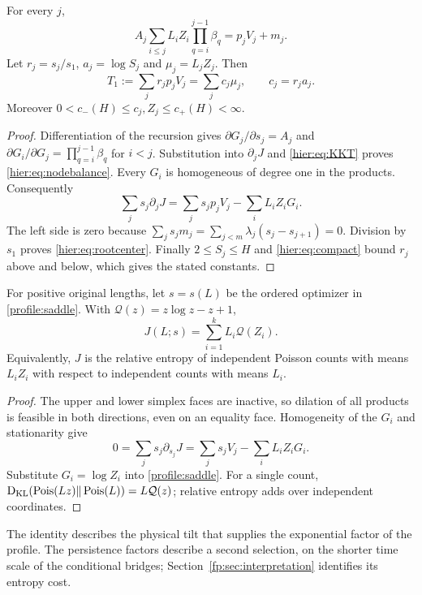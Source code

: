 \begin{lemma}\label{hier:lem:KKT}
For every $j$,
\begin{equation}
 A_j\sum_{i\le j}L_iZ_i\prod_{q=i}^{j-1}\beta_q=p_jV_j+m_j.
 \label{hier:eq:nodebalance}
\end{equation}
Let $r_j=s_j/s_1$, $a_j=\log S_j$ and
$\mu_j=L_jZ_j$. Then
\begin{equation}
 T_1:=\sum_jr_jp_jV_j=\sum_j c_j\mu_j,
 \qquad c_j=r_ja_j. \label{hier:eq:rootcenter}
\end{equation}
Moreover $0<c_-(H)\le c_j,Z_j\le c_+(H)<\infty$.
\end{lemma}
\begin{proof}
Differentiation of the recursion gives
$\partial G_j/\partial s_j=A_j$ and
$\partial G_i/\partial G_j=\prod_{q=i}^{j-1}\beta_q$ for $i<j$.
Substitution into $\partial_jJ$ and \eqref{hier:eq:KKT} proves
\eqref{hier:eq:nodebalance}.
Every $G_i$ is homogeneous of degree one in the products.
Consequently
\[
 \sum_js_j\partial_jJ=\sum_js_jp_jV_j-\sum_iL_iZ_iG_i.
\]
The left side is zero because
$\sum_js_jm_j=\sum_{j<m}\lambda_j(s_j-s_{j+1})=0$.
Division by $s_1$ proves \eqref{hier:eq:rootcenter}. Finally
$2\le S_j\le H$ and \eqref{hier:eq:compact} bound $r_j$ above and below,
which gives the stated constants.
\end{proof}

\begin{proposition}\label{fp:prop:poisson}
For positive original lengths, let $s=s(L)$ be the ordered optimizer
in \eqref{profile:saddle}. With $\mathcal Q(z)=z\log z-z+1$,
\begin{equation}\label{fp:eq:poisson}
 J(L;s)=\sum_{i=1}^k L_i\mathcal Q(Z_i).
\end{equation}
Equivalently, $J$ is the relative entropy of independent Poisson counts
with means $L_iZ_i$ with respect to independent counts with means $L_i$.
\end{proposition}
\begin{proof}
The upper and lower simplex faces are inactive, so dilation of all
products is feasible in both directions, even on an equality face.
Homogeneity of the $G_i$ and stationarity give
\[
 0=\sum_j s_j\partial_{s_j}J
   =\sum_j s_jV_j-\sum_iL_iZ_iG_i.
\]
Substitute $G_i=\log Z_i$ into \eqref{profile:saddle}.
For a single count,
$\operatorname{D_{\mathrm{KL}}}(\operatorname{Pois}(Lz)\Vert\operatorname{Pois}(L))=L\mathcal Q(z)$;
relative entropy adds over independent coordinates.
\end{proof}
The identity describes the physical tilt that supplies the exponential
factor of the profile. The persistence factors describe a second
selection, on the shorter time scale of the conditional bridges;
Section~\ref{fp:sec:interpretation} identifies its entropy cost.

